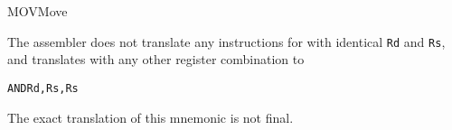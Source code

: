 \begin{instruction}{MOV}{Move}
  \begin{remarks}
The assembler does not translate any instructions for \texttt{\mnemonic} with identical \texttt{Rd} and \texttt{Rs}, and translates \texttt{\mnemonic} with any other register combination to
\begin{alltt}
  AND  Rd, Rs, Rs
\end{alltt}
  \end{remarks}
  \begin{notice}The exact translation of this mnemonic is not final.\end{notice}
\end{instruction}
